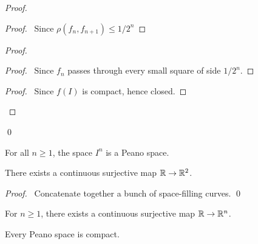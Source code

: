 \begin{proof}
    \pf
    \begin{proof}
        \pf\ Since $\rho(f_n,f_{n+1}) \leq 1/2^n$
    \end{proof}
    \begin{proof}
        \begin{proof}
            \pf\ Since $f_n$ passes through every small square of side $1/2^n$.
        \end{proof}
        \begin{proof}
            \pf\ Since $f(I)$ is compact, hence closed.
        \end{proof}
    \end{proof}
    \qed
\end{proof}

\begin{corollary}
    For all $n \geq 1$, the space $I^n$ is a Peano space.
\end{corollary}

\begin{proposition}
    There exists a continuous surjective map $\mathbb{R} \rightarrow \mathbb{R}^2$.
\end{proposition}

\begin{proof}
    \pf\ Concatenate together a bunch of space-filling curves. \qed
\end{proof}

\begin{corollary}
    For $n \geq 1$, there exists a continuous surjective map $\mathbb{R} \rightarrow \mathbb{R}^n$.
\end{corollary}

\begin{proposition}
    Every Peano space is compact.
\end{proposition}

